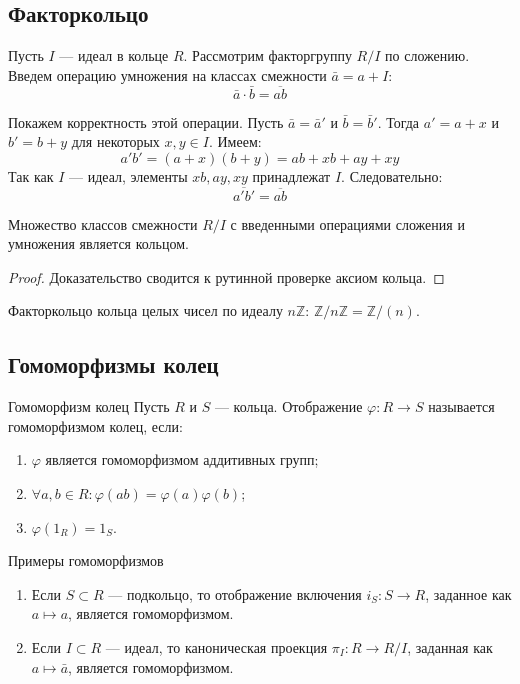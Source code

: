 \subsection{Факторкольцо}

Пусть $I$ --- идеал в кольце $R$. Рассмотрим факторгруппу $R/I$ по сложению. Введем операцию умножения на классах смежности $\bar{a} = a + I$:
\[ \bar{a} \cdot \bar{b} = \overline{ab} \]

Покажем корректность этой операции. Пусть $\bar{a} = \bar{a}'$ и $\bar{b} = \bar{b}'$. Тогда $a' = a + x$ и $b' = b + y$ для некоторых $x, y \in I$. Имеем:
\[ a'b' = (a + x)(b + y) = ab + xb + ay + xy \]
Так как $I$ --- идеал, элементы $xb, ay, xy$ принадлежат $I$. Следовательно:
\[ \overline{a'b'} = \overline{ab} \]

\begin{Proposition}{}{}
	Множество классов смежности $R/I$ с введенными операциями сложения и умножения является кольцом.
\end{Proposition}

\begin{proof}
	Доказательство сводится к рутинной проверке аксиом кольца.
\end{proof}

\begin{Example}{}{}
	Факторкольцо кольца целых чисел по идеалу $n\mathbb{Z}$: $\mathbb{Z}/n\mathbb{Z} = \mathbb{Z}/(n)$.
\end{Example}

\subsection{Гомоморфизмы колец}

\begin{Definition}{Гомоморфизм колец}{}
	Пусть $R$ и $S$ --- кольца. Отображение $\varphi\colon R \to S$ называется гомоморфизмом колец, если:
	\begin{enumerate}
		\item $\varphi$ является гомоморфизмом аддитивных групп;
		\item $\forall a, b \in R \colon \varphi(ab) = \varphi(a)\varphi(b)$;
		\item $\varphi(1_R) = 1_S$.
	\end{enumerate}
\end{Definition}

\begin{Example}{Примеры гомоморфизмов}{}
	\begin{enumerate}
		\item Если $S \subset R$ --- подкольцо, то отображение включения $i_S\colon S \to R$, заданное как $a \mapsto a$, является гомоморфизмом.
		\item Если $I \subset R$ --- идеал, то каноническая проекция $\pi_I\colon R \to R/I$, заданная как $a \mapsto \bar{a}$, является гомоморфизмом.
	\end{enumerate}
\end{Example}

